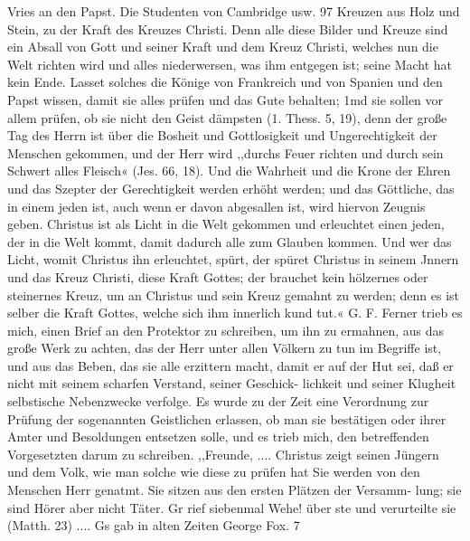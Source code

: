 {%
Vries an den Papst. Die Studenten von Cambridge usw. 97
Kreuzen aus Holz und Stein, zu der Kraft des Kreuzes Christi.
Denn alle diese Bilder und Kreuze sind ein Absall von Gott und
seiner Kraft und dem Kreuz Christi, welches nun die Welt richten
wird und alles niederwersen, was ihm entgegen ist; seine Macht
hat kein Ende.
Lasset solches die Könige von Frankreich und von Spanien
und den Papst wissen, damit sie alles prüfen und das Gute behalten;
1md sie sollen vor allem prüfen, ob sie nicht den Geist dämpsten
(1. Thess. 5, 19), denn der große Tag des Herrn ist über die
Bosheit und Gottlosigkeit und Ungerechtigkeit der Menschen
gekommen, und der Herr wird ,,durchs Feuer richten und durch
sein Schwert alles Fleisch« (Jes. 66, 18). Und die Wahrheit
und die Krone der Ehren und das Szepter der Gerechtigkeit
werden erhöht werden; und das Göttliche, das in einem jeden
ist, auch wenn er davon abgesallen ist, wird hiervon Zeugnis
geben. Christus ist als Licht in die Welt gekommen und erleuchtet
einen jeden, der in die Welt kommt, damit dadurch alle zum
Glauben kommen. Und wer das Licht, womit Christus ihn
erleuchtet, spürt, der spüret Christus in seinem Jnnern und das
Kreuz Christi, diese Kraft Gottes; der brauchet kein hölzernes oder
steinernes Kreuz, um an Christus und sein Kreuz gemahnt zu
werden; denn es ist selber die Kraft Gottes, welche sich ihm
innerlich kund tut.« G. F.
Ferner trieb es mich, einen Brief an den Protektor zu
schreiben, um ihn zu ermahnen, aus das große Werk zu achten,
das der Herr unter allen Völkern zu tun im Begriffe ist, und
aus das Beben, das sie alle erzittern macht, damit er auf der
Hut sei, daß er nicht mit seinem scharfen Verstand, seiner Geschick-
lichkeit und seiner Klugheit selbstische Nebenzwecke verfolge.
Es wurde zu der Zeit eine Verordnung zur Prüfung der
sogenannten Geistlichen erlassen, ob man sie bestätigen oder ihrer
Amter und Besoldungen entsetzen solle, und es trieb mich, den
betreffenden Vorgesetzten darum zu schreiben.
,,Freunde,
.... Christus zeigt seinen Jüngern und dem Volk, wie
man solche wie diese zu prüfen hat Sie werden von den Menschen
Herr genatmt. Sie sitzen aus den ersten Plätzen der Versamm-
lung; sie sind Hörer aber nicht Täter. Gr rief siebenmal Wehe!
über ste und verurteilte sie (Matth. 23) .... Gs gab in alten Zeiten
George Fox. 7


}
